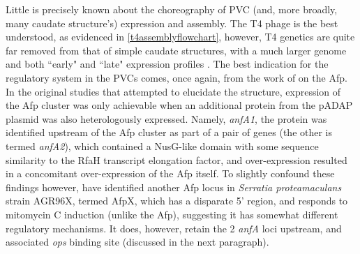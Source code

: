 Little is precisely known about the choreography of PVC (and, more broadly, many caudate structure's) expression and assembly. The T4 phage is the best understood, as evidenced in \vref{t4assemblyflowchart}, however, T4 genetics are quite far removed from that of simple caudate structures, with a much larger genome and both ``early" and ``late" expression profiles \citep{OFarrell1973}. The best indication for the regulatory system in the PVCs comes, once again, from the work of \cite{Hurst2007a, Hurst2004} on the Afp. In the original studies that attempted to elucidate the structure, expression of the Afp cluster was only achievable when an additional protein from the pADAP plasmid was also heterologously expressed. Namely, \emph{anfA1}, the protein was identified upstream of the Afp cluster as part of a pair of genes (the other is termed \emph{anfA2}), which contained a NusG-like domain with some sequence similarity to the RfaH transcript elongation factor, and over-expression resulted in a concomitant over-expression of the Afp itself. To slightly confound these findings however, \cite{Hurst2018} have identified another Afp locus in \emph{Serratia proteamaculans} strain AGR96X, termed AfpX, which has a disparate 5' region, and responds to mitomycin C induction (unlike the Afp), suggesting it has somewhat different regulatory mechanisms. It does, however, retain the 2 \emph{anfA} loci upstream, and associated \emph{ops} binding site (discussed in the next paragraph).

